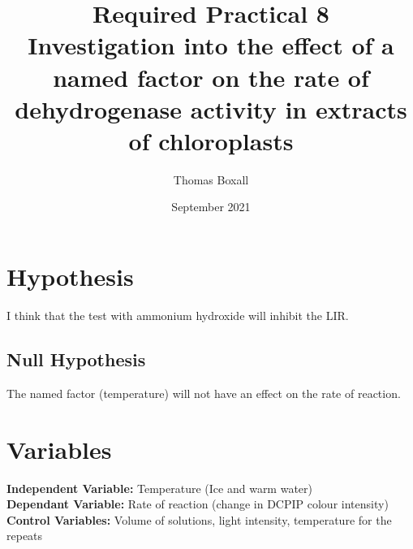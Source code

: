 \documentclass{thomasClass}
\title{\textbf{Required Practical 8}
\\Investigation into the effect of a named factor on the rate of dehydrogenase activity in extracts of chloroplasts
}
\author{Thomas Boxall}
\date{September 2021}
\begin{document}
\maketitle

\section{Hypothesis}
I think that the test with ammonium hydroxide will inhibit the LIR.
\subsection{Null Hypothesis}
The named factor (temperature) will not have an effect on the rate of reaction.

\section{Variables}
\textbf{Independent Variable: }Temperature (Ice and warm water)\\
\textbf{Dependant Variable: }Rate of reaction (change in DCPIP colour intensity)\\
\textbf{Control Variables: }Volume of solutions, light intensity, temperature for the repeats
\end{document}
